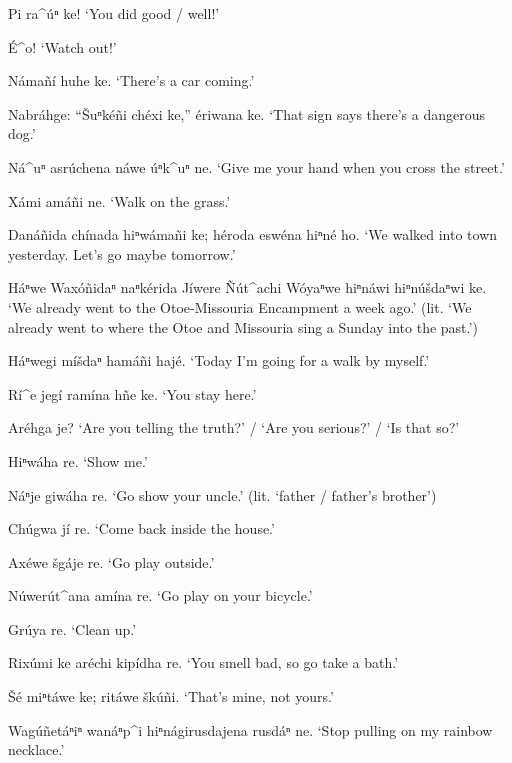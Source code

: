 \documentclass[output=paper]{LSP/langsci}
\begin{document}
\begin{list}{}{}
\item{Pi ra\^{ }úⁿ ke! `You did good / well!'}
\item{\'E\^{ }o! `Watch out!'}
\item{Námañí huhe ke. `There's a car coming.'}
\item{Nabráhge: ``\v{S}uⁿkéñi chéxi ke,'' ériwana ke. `That sign says there's a dangerous dog.'}
\item{Ná\^{ }uⁿ asrúchena náwe úⁿk\^{ }uⁿ ne. `Give me your hand when you cross the street.'}
\item{Xámi amáñi ne. `Walk on the grass.'}
\item{Danáñida chínada hiⁿwámañi ke; héroda eswéna hiⁿné ho. `We walked into town yesterday. Let's go maybe tomorrow.'}
\item{Háⁿwe Waxóñidaⁿ naⁿkérida Jíwere \~Nút\^{ }achi Wóyaⁿwe hiⁿnáwi hiⁿnúšdaⁿwi ke. `We already went to the Otoe-Missouria Encampment a week ago.' (lit. `We already went to where the Otoe and Missouria sing a Sunday into the past.')}
\item{Háⁿwegi míšdaⁿ hamáñi hajé.  `Today I'm going for a walk by myself.'}
\item{Rí\^{ }e jegí ramína hñe ke. `You stay here.'}
\item{Aréhga je? `Are you telling the truth?' / `Are you serious?' / `Is that so?'}
\item{Hiⁿwáha re. `Show me.'}
\item{Náⁿje giwáha re. `Go show your uncle.' (lit. `father / father's brother')}
\item{Chúgwa jí re.	`Come back inside the house.'}
\item{}
\item{Axéwe šgáje re. `Go play outside.'}
\item{Núwerút\^{ }ana amína re.	`Go play on your bicycle.'}
\item{Grúya re.	`Clean up.'}
\item{Rixúmi ke aréchi kipídha re. `You smell bad, so go take a bath.'}
\item{\v{S}é miⁿtáwe ke;  ritáwe škúñi. `That's mine, not yours.'}
\item{Wagúñetáⁿiⁿ wanáⁿp\^{ }i hiⁿnágirusdajena rusdáⁿ ne. `Stop pulling on my rainbow necklace.'}
\end{list} 
 
\end{document}
